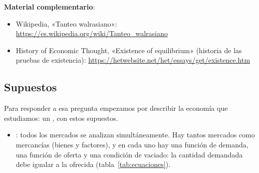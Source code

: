\documentclass[11pt]{article}
\begin{document}
\begin{anotaciones}
\textbf{Material complementario}:
\begin{itemize}
\item Wikipedia, «Tanteo walrasiano»\nocite{Wikipedia2026Tanteo}: \url{https://es.wikipedia.org/wiki/Tanteo_walrasiano}
\item History of Economic Thought, «Existence of equilibrium» (historia de las pruebas de existencia): \url{https://hetwebsite.net/het/essays/get/existence.htm}
\end{itemize}
\end{anotaciones}

\subsection{Supuestos}\label{sec:supuestos}

Para responder a esa pregunta empezamos por describir la economía que estudiamos: un , con estos supuestos.

\begin{itemize}
\item {}: todos los mercados se analizan simultáneamente. Hay tantos mercados como mercancías (bienes y factores), y en cada uno hay una función de demanda, una función de oferta y una condición de vaciado: la cantidad demandada debe igualar a la ofrecida (tabla~\ref{tab:ecuaciones}).
\end{itemize}
\end{document}
